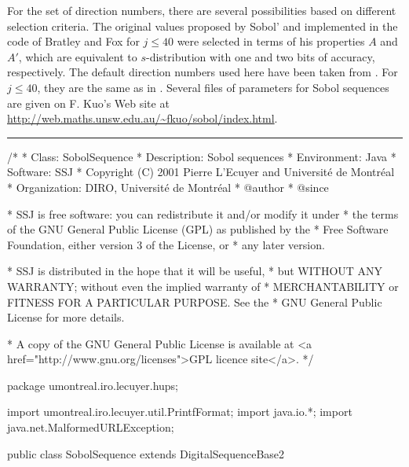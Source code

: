 For the set of direction numbers, there are several possibilities
based on different selection criteria.
The original values proposed by Sobol' and implemented in the code of
Bratley and Fox \cite{rBRA88c} for $j\le 40$ 
were selected in terms of his properties $A$ and $A'$, 
which are equivalent to $s$-distribution with one and 
two bits of accuracy, respectively.
The default direction numbers used here have been taken from 
.
For $j\le 40$, they are the same as in 
 .
Several files of parameters for Sobol sequences are given on F. Kuo's
Web site at \url{http://web.maths.unsw.edu.au/~fkuo/sobol/index.html}.
%


\bigskip\hrule\bigskip

\begin{code}
\begin{hide}
/*
 * Class:        SobolSequence
 * Description:  Sobol sequences
 * Environment:  Java
 * Software:     SSJ 
 * Copyright (C) 2001  Pierre L'Ecuyer and Université de Montréal
 * Organization: DIRO, Université de Montréal
 * @author       
 * @since

 * SSJ is free software: you can redistribute it and/or modify it under
 * the terms of the GNU General Public License (GPL) as published by the
 * Free Software Foundation, either version 3 of the License, or
 * any later version.

 * SSJ is distributed in the hope that it will be useful,
 * but WITHOUT ANY WARRANTY; without even the implied warranty of
 * MERCHANTABILITY or FITNESS FOR A PARTICULAR PURPOSE.  See the
 * GNU General Public License for more details.

 * A copy of the GNU General Public License is available at
   <a href="http://www.gnu.org/licenses">GPL licence site</a>.
 */
\end{hide}
package umontreal.iro.lecuyer.hups;\begin{hide}
import umontreal.iro.lecuyer.util.PrintfFormat;
import java.io.*;
import java.net.MalformedURLException;
\end{hide}

public class SobolSequence extends DigitalSequenceBase2 \begin{hide} { 

    // Maximal dimension for primitive polynomials included in this file
    protected static final int MAXDIM    = 360;
    protected static final int MAXDEGREE = 18;  // Of primitive polynomial
    private String filename = null;
\end{hide}
\end{code}

